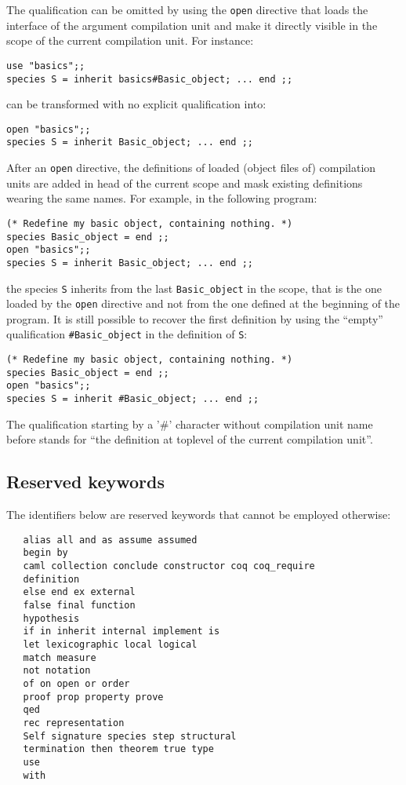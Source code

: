 The qualification can be omitted by using the {\tt open} directive
that loads the interface of the argument compilation unit and make it
directly visible in the scope of the current compilation unit. For
instance:

{\scriptsize
\begin{lstlisting}
use "basics";;
species S = inherit basics#Basic_object; ... end ;;
\end{lstlisting}
}
can be transformed with no explicit qualification into:

{\scriptsize
\begin{lstlisting}
open "basics";;
species S = inherit Basic_object; ... end ;;
\end{lstlisting}
}

After an {\tt open} directive, the definitions of loaded (object files
of) compilation units are added in head of the current scope and mask
existing definitions wearing the same names. For example, in
the following program:

{\scriptsize
\begin{lstlisting}
(* Redefine my basic object, containing nothing. *)
species Basic_object = end ;;
open "basics";;
species S = inherit Basic_object; ... end ;;
\end{lstlisting}
}
the species {\tt S} inherits from the last {\tt Basic\_object} in the
scope, that is the one loaded by the {\tt open} directive and not from
the one defined at the beginning of the program. It is still possible
to recover the first definition by using the ``empty'' qualification
{\tt \#Basic\_object} in the definition of {\tt S}:

{\scriptsize
\begin{lstlisting}
(* Redefine my basic object, containing nothing. *)
species Basic_object = end ;;
open "basics";;
species S = inherit #Basic_object; ... end ;;
\end{lstlisting}
}

The qualification starting by a '\#' character without compilation
unit name before stands for ``the definition at toplevel of the
current compilation unit''.

\subsection{Reserved keywords}
The identifiers below are reserved keywords that cannot be employed
otherwise:
\begin{verbatim}
   alias all and as assume assumed
   begin by
   caml collection conclude constructor coq coq_require
   definition
   else end ex external
   false final function
   hypothesis
   if in inherit internal implement is
   let lexicographic local logical
   match measure
   not notation
   of on open or order
   proof prop property prove
   qed
   rec representation
   Self signature species step structural
   termination then theorem true type
   use
   with
\end{verbatim}

